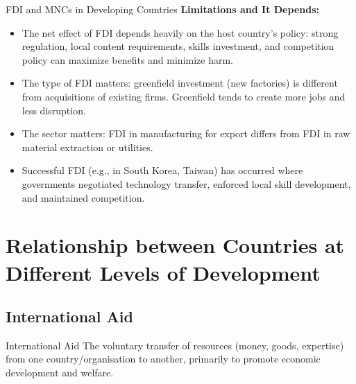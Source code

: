 \documentclass[11pt, a4paper, twoside]{book}
\begin{document}
\begin{evaluation}{FDI and MNCs in Developing Countries}
\textbf{Limitations and It Depends:}
\begin{itemize}
  \item The net effect of FDI depends heavily on the host country's policy: strong regulation, local content requirements, skills investment, and competition policy can maximize benefits and minimize harm.
  \item The type of FDI matters: greenfield investment (new factories) is different from acquisitions of existing firms. Greenfield tends to create more jobs and less disruption.
  \item The sector matters: FDI in manufacturing for export differs from FDI in raw material extraction or utilities.
  \item Successful FDI (e.g., in South Korea, Taiwan) has occurred where governments negotiated technology transfer, enforced local skill development, and maintained competition.
\end{itemize}
\end{evaluation}

\section{Relationship between Countries at Different Levels of Development}

\subsection{International Aid}

\begin{keyterm}{International Aid}
The voluntary transfer of resources (money, goods, expertise) from one country/organisation to another, primarily to promote economic development and welfare.
\end{keyterm}
\end{document}
